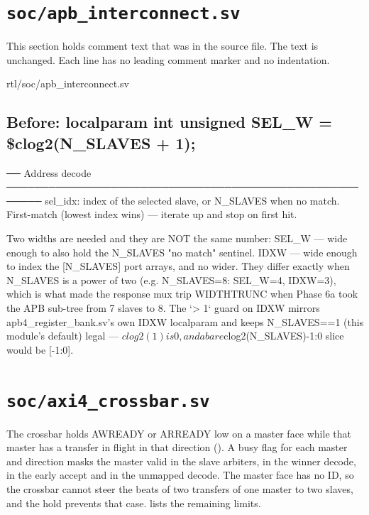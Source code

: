 \section{\texttt{soc/apb\_interconnect.sv}}\label{tm:mod:apb-interconnect}

This section holds comment text that was in the source file. The text is unchanged. Each line has no leading comment marker and no indentation.

\begin{relocated}{rtl/soc/apb_interconnect.sv}

\subsection*{Before: localparam int unsigned SEL\_W = \$clog2(N\_SLAVES + 1);}

\begin{textblock}
── Address decode ───────────────────────────────────────────────────────
sel_idx: index of the selected slave, or N_SLAVES when no match.
First-match (lowest index wins) — iterate up and stop on first hit.

Two widths are needed and they are NOT the same number:
  SEL_W — wide enough to also hold the N_SLAVES "no match" sentinel.
  IDXW  — wide enough to index the [N_SLAVES] port arrays, and no wider.
They differ exactly when N_SLAVES is a power of two (e.g. N_SLAVES=8:
SEL_W=4, IDXW=3), which is what made the response mux trip WIDTHTRUNC
when Phase 6a took the APB sub-tree from 7 slaves to 8. The `> 1` guard
on IDXW mirrors apb4_register_bank.sv's own IDXW localparam and keeps
N_SLAVES==1 (this module's default) legal — $clog2(1) is 0, and a bare
$clog2(N_SLAVES)-1:0 slice would be [-1:0].
\end{textblock}

\end{relocated}

\section{\texttt{soc/axi4\_crossbar.sv}}\label{tm:mod:axi4-crossbar}

\begin{information}
The crossbar holds AWREADY or ARREADY low on a master face while that master has a transfer in flight in that direction (). A busy flag for each master and direction masks the master valid in the slave arbiters, in the winner decode, in the early accept and in the unmapped decode. The master face has no ID, so the crossbar cannot steer the beats of two transfers of one master to two slaves, and the hold prevents that case.  lists the remaining limits.
\end{information}

